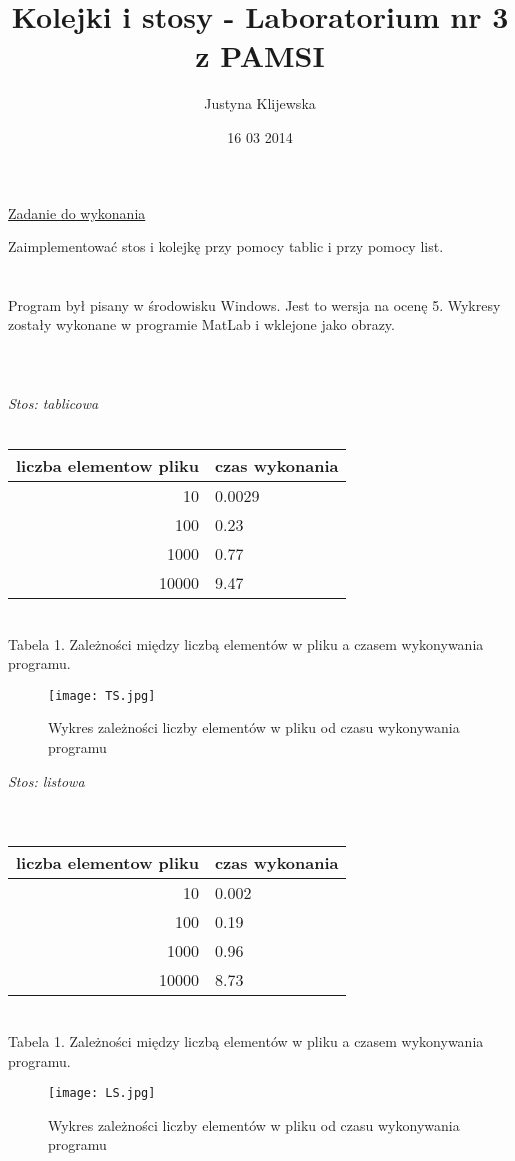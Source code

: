 \documentclass[11pt]{article}
\begin{document}
\begin{titlepage}
\title{Kolejki i stosy - Laboratorium nr 3 z PAMSI}
\author{Justyna Klijewska}
\date{16 03 2014}
\maketitle
\end{titlepage}

\underline{Zadanie do wykonania}

Zaimplementować stos i kolejkę przy pomocy tablic i przy pomocy list. 
\\ \\ \\
Program był pisany w środowisku Windows. Jest to wersja na ocenę 5. Wykresy zostały wykonane w programie MatLab i wklejone jako obrazy. 
\\ \\ \\ \\ 
\textit{Stos: tablicowa }
\\ \\


\begin{tabular}{|r|l|}
  \hline 
  liczba elementow pliku & czas wykonania \\
  \hline
  10 & 0.0029 \\
  \hline
  100 & 0.23 \\
  \hline
  1000 & 0.77 \\
  \hline
  10000 & 9.47 \\
  \hline
\end{tabular} 
\\ Tabela 1. Zależności między liczbą elementów w pliku a czasem wykonywania programu.
\\
\begin{figure}[ht!]
\centering
\texttt{[image: TS.jpg]}
\caption{Wykres zależności liczby elementów w pliku od czasu wykonywania programu}
\label{overflow}
\end{figure}


\textit{Stos: listowa }
\\ \\ \\
\begin{tabular}{|r|l|}
  \hline 
  liczba elementow pliku & czas wykonania \\
  \hline
  10 & 0.002 \\
  \hline
  100 & 0.19 \\
  \hline
  1000 & 0.96 \\
  \hline
  10000 & 8.73 \\
  \hline
\end{tabular} 
\\ Tabela 1. Zależności między liczbą elementów w pliku a czasem wykonywania programu.
\\
\begin{figure}[ht!]
\centering
\texttt{[image: LS.jpg]}
\caption{Wykres zależności liczby elementów w pliku od czasu wykonywania programu}
\label{overflow}
\end{figure}
\end{document}
